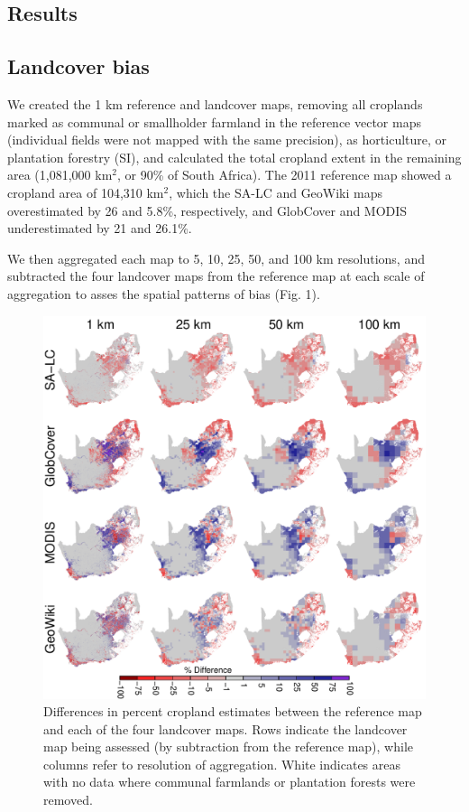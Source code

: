 \documentclass{pnastwo}
\begin{document}
\begin{article}
\vspace{-0.5 cm}
\section{Results}
\subsection{Landcover bias}

We created the 1 km reference and landcover maps, removing all croplands marked as communal or smallholder farmland in the reference vector maps (individual fields were not mapped with the same precision), as horticulture, or plantation forestry (SI), and calculated the total cropland extent in the remaining area (1,081,000 km$^2$, or 90\% of South Africa).  The 2011 reference map showed a cropland area of 104,310 km$^2$, which the SA-LC and GeoWiki maps overestimated by 26 and 5.8\%, respectively, and GlobCover and MODIS underestimated by 21 and 26.1\%.  

We then aggregated each map to 5, 10, 25, 50, and 100 km resolutions, and subtracted the four landcover maps from the reference map at each scale of aggregation to asses the spatial patterns of bias (Fig. 1). 

\vspace{-0.25 cm}
\begin{figure}[ht]
\centerline{\includegraphics[width=.5\textwidth]{figures/bias_map.pdf}}
\caption{Differences in percent cropland estimates between the reference map and each of the four landcover maps. Rows indicate the landcover map being assessed (by subtraction from the reference map), while columns refer to resolution of aggregation. White indicates areas with no data where communal farmlands or plantation forests were removed.}\label{afoto}
\end{figure}


\end{article}
\end{document}
